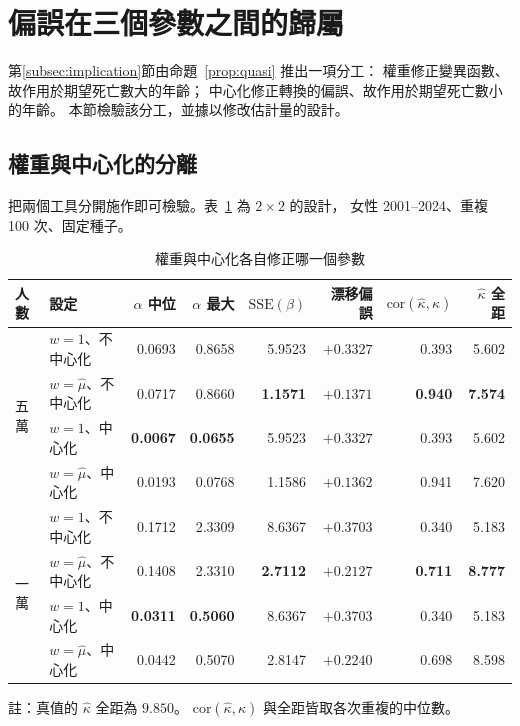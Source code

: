 \documentclass[UTF8, fontset=macnew, a4paper, 12pt]{ctexart}
\begin{document}
\section{偏誤在三個參數之間的歸屬}\label{sec:attrib}

第\ref{subsec:implication}節由命題~\ref{prop:quasi} 推出一項分工：
權重修正變異函數、故作用於期望死亡數大的年齡；
中心化修正轉換的偏誤、故作用於期望死亡數小的年齡。
本節檢驗該分工，並據以修改估計量的設計。

\subsection{權重與中心化的分離}\label{subsec:twobytwo}

把兩個工具分開施作即可檢驗。表~\ref{tab:twobytwo} 為 $2\times2$ 的設計，
女性 2001--2024、重複 100 次、固定種子。

\begin{table}[H]
\centering
\caption{權重與中心化各自修正哪一個參數}
\small
\renewcommand{\arraystretch}{1.1}
\begin{tabular}{llrrrrrr}
\toprule
人數 & 設定 & $\alpha$ 中位 & $\alpha$ 最大 & $\mathrm{SSE}(\beta)$
& 漂移偏誤 & $\mathrm{cor}(\hat\kappa,\kappa)$ & $\hat\kappa$ 全距\\
\midrule
\multirow{4}{*}{五萬}
 & $w=1$、不中心化 & 0.0693 & 0.8658 & 5.9523 & $+0.3327$ & 0.393 & 5.602\\
 & $w=\hat\mu$、不中心化 & 0.0717 & 0.8660 & \textbf{1.1571} & $\mathbf{+0.1371}$ & \textbf{0.940} & \textbf{7.574}\\
 & $w=1$、中心化 & \textbf{0.0067} & \textbf{0.0655} & 5.9523 & $+0.3327$ & 0.393 & 5.602\\
 & $w=\hat\mu$、中心化 & 0.0193 & 0.0768 & 1.1586 & $+0.1362$ & 0.941 & 7.620\\
\midrule
\multirow{4}{*}{一萬}
 & $w=1$、不中心化 & 0.1712 & 2.3309 & 8.6367 & $+0.3703$ & 0.340 & 5.183\\
 & $w=\hat\mu$、不中心化 & 0.1408 & 2.3310 & \textbf{2.7112} & $\mathbf{+0.2127}$ & \textbf{0.711} & \textbf{8.777}\\
 & $w=1$、中心化 & \textbf{0.0311} & \textbf{0.5060} & 8.6367 & $+0.3703$ & 0.340 & 5.183\\
 & $w=\hat\mu$、中心化 & 0.0442 & 0.5070 & 2.8147 & $+0.2240$ & 0.698 & 8.598\\
\bottomrule
\end{tabular}

\vspace{2pt}
\parbox{0.92\textwidth}{\footnotesize 註：真值的 $\hat\kappa$ 全距為 $9.850$。
$\mathrm{cor}(\hat\kappa,\kappa)$ 與全距皆取各次重複的中位數。}
\label{tab:twobytwo}
\end{table}
\end{document}
